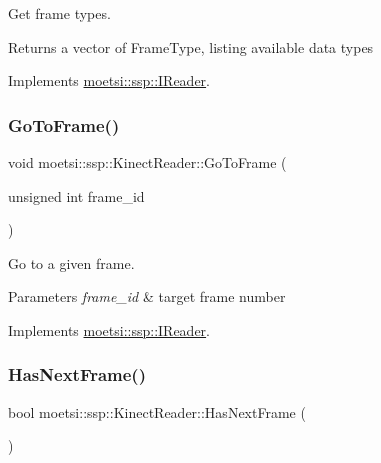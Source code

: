 Get frame types. 

\begin{DoxyReturn}{Returns}
a vector of Frame\+Type, listing available data types 
\end{DoxyReturn}


Implements \hyperlink{classmoetsi_1_1ssp_1_1IReader_a4116c1931fde7bd66133934ffdca1cce}{moetsi\+::ssp\+::\+I\+Reader}.

\mbox{\label{classmoetsi_1_1ssp_1_1KinectReader_a315690c46e153a35d4ded1189e93af08}} 
\subsubsection{\texorpdfstring{Go\+To\+Frame()}{GoToFrame()}}
{\footnotesize\ttfamily void moetsi\+::ssp\+::\+Kinect\+Reader\+::\+Go\+To\+Frame (\begin{DoxyParamCaption}\item[{unsigned int}]{frame\+\_\+id }\end{DoxyParamCaption})\hspace{0.3cm}{\ttfamily [virtual]}}



Go to a given frame. 


\begin{DoxyParams}{Parameters}
{\em frame\+\_\+id} & target frame number \\
\hline
\end{DoxyParams}


Implements \hyperlink{classmoetsi_1_1ssp_1_1IReader_a6f1be3c06538992cca6d550bd9566681}{moetsi\+::ssp\+::\+I\+Reader}.

\mbox{\label{classmoetsi_1_1ssp_1_1KinectReader_a08934b6eff437142e482bb21780ca171}} 
\subsubsection{\texorpdfstring{Has\+Next\+Frame()}{HasNextFrame()}}
{\footnotesize\ttfamily bool moetsi\+::ssp\+::\+Kinect\+Reader\+::\+Has\+Next\+Frame (\begin{DoxyParamCaption}{ }\end{DoxyParamCaption})\hspace{0.3cm}{\ttfamily [virtual]}}



